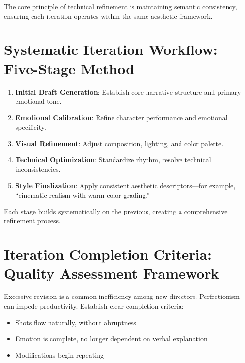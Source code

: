 The core principle of technical refinement is maintaining semantic consistency, ensuring each iteration operates within the same aesthetic framework.

\section{Systematic Iteration Workflow: Five-Stage Method}
\label{sec:five-act-iteration}

\begin{enumerate}
\item \textbf{Initial Draft Generation}: Establish core narrative structure and primary emotional tone.

\item \textbf{Emotional Calibration}: Refine character performance and emotional specificity.

\item \textbf{Visual Refinement}: Adjust composition, lighting, and color palette.

\item \textbf{Technical Optimization}: Standardize rhythm, resolve technical inconsistencies.

\item \textbf{Style Finalization}: Apply consistent aesthetic descriptors—for example, ``cinematic realism with warm color grading.''
\end{enumerate}

Each stage builds systematically on the previous, creating a comprehensive refinement process.

\section{Iteration Completion Criteria: Quality Assessment Framework}
\label{sec:knowing-when-stop}

Excessive revision is a common inefficiency among new directors. Perfectionism can impede productivity. Establish clear completion criteria:

\begin{itemize}
\item Shots flow naturally, without abruptness
\item Emotion is complete, no longer dependent on verbal explanation
\item Modifications begin repeating
\end{itemize}

